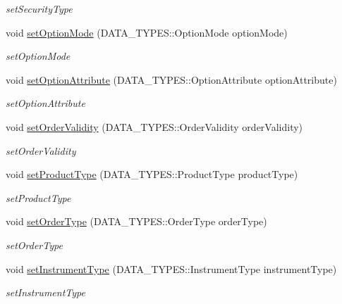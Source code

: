 \begin{DoxyCompactItemize}
\begin{DoxyCompactList}\small\item\em set\-Security\-Type \end{DoxyCompactList}\item 
void \hyperlink{class_a_p_i2_1_1_single_order_a2afccefbe06b28f0e63fcf41fe500357}{set\-Option\-Mode} (D\-A\-T\-A\-\_\-\-T\-Y\-P\-E\-S\-::\-Option\-Mode option\-Mode)
\begin{DoxyCompactList}\small\item\em set\-Option\-Mode \end{DoxyCompactList}\item 
void \hyperlink{class_a_p_i2_1_1_single_order_a21a30501f824b4325152ffa499dc1735}{set\-Option\-Attribute} (D\-A\-T\-A\-\_\-\-T\-Y\-P\-E\-S\-::\-Option\-Attribute option\-Attribute)
\begin{DoxyCompactList}\small\item\em set\-Option\-Attribute \end{DoxyCompactList}\item 
void \hyperlink{class_a_p_i2_1_1_single_order_ab328771801e0f7e92115966a499495a3}{set\-Order\-Validity} (D\-A\-T\-A\-\_\-\-T\-Y\-P\-E\-S\-::\-Order\-Validity order\-Validity)
\begin{DoxyCompactList}\small\item\em set\-Order\-Validity \end{DoxyCompactList}\item 
void \hyperlink{class_a_p_i2_1_1_single_order_ac89c2c4e0e8c898d21c597aa44541158}{set\-Product\-Type} (D\-A\-T\-A\-\_\-\-T\-Y\-P\-E\-S\-::\-Product\-Type product\-Type)
\begin{DoxyCompactList}\small\item\em set\-Product\-Type \end{DoxyCompactList}\item 
void \hyperlink{class_a_p_i2_1_1_single_order_a3626e639531ac15568b190a21a393d92}{set\-Order\-Type} (D\-A\-T\-A\-\_\-\-T\-Y\-P\-E\-S\-::\-Order\-Type order\-Type)
\begin{DoxyCompactList}\small\item\em set\-Order\-Type \end{DoxyCompactList}\item 
void \hyperlink{class_a_p_i2_1_1_single_order_a09d883b738c0a35077fc711adb8b0a25}{set\-Instrument\-Type} (D\-A\-T\-A\-\_\-\-T\-Y\-P\-E\-S\-::\-Instrument\-Type instrument\-Type)
\begin{DoxyCompactList}\small\item\em set\-Instrument\-Type \end{DoxyCompactList}\item 

\end{DoxyCompactItemize}
